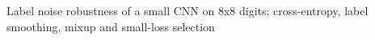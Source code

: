 Label noise robustness of a small CNN on 8x8 digits: cross-entropy, label smoothing, mixup and small-loss selection
